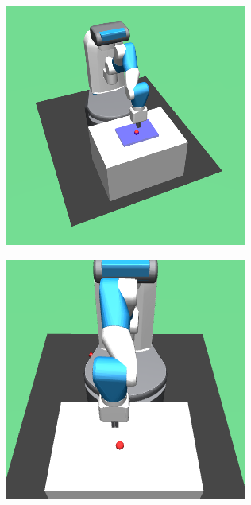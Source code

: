 \begin{figure}[h!]
  \centering
  \begin{subfigure}{0.24\columnwidth}
    \includegraphics[width=\linewidth]{figures/chapter6/fetch_vol_resize.png}
    \label{fig:fetch_volumn}
  \end{subfigure}
  \begin{subfigure}{0.24\columnwidth}
    \includegraphics[width=\linewidth]{figures/chapter6/fetch_view.png}

\end{subfigure}
\end{figure}
